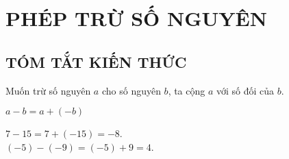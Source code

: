 \section{PHÉP TRỪ SỐ NGUYÊN}
\subsection{TÓM TẮT KIẾN THỨC}
\begin{tomtat}
Muốn trừ số nguyên $a$ cho số nguyên $b$, ta cộng $a$ với số đối của $b$.
\begin{center}
$a-b = a+ (-b)$
\end{center}
\begin{vd}
$7-15 = 7+ (-15) = -8$.\\
$(-5) - (-9) = (-5)+9 =4$.
\end{vd}
\end{tomtat}
